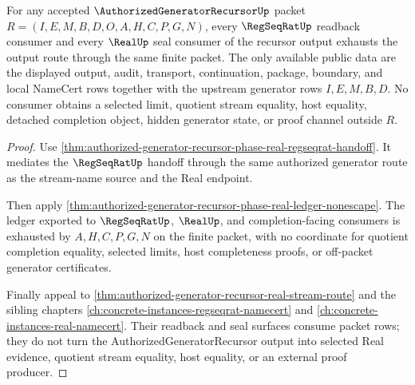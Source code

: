 \begin{theorem}
\label{thm:authorized-generator-recursor-regseqrat-real-seal-output-exhaustion}
For any accepted $\AuthorizedGeneratorRecursorUp$ packet $R=(I,E,M,B,D,O,A,H,C,P,G,N)$, every $\RegSeqRatUp$ readback consumer and every $\RealUp$ seal consumer of the recursor output exhausts the output route through the same finite packet. The only available public data are the displayed output, audit, transport, continuation, package, boundary, and local NameCert rows together with the upstream generator rows $I,E,M,B,D$. No consumer obtains a selected limit, quotient stream equality, host equality, detached completion object, hidden generator state, or proof channel outside $R$.
\end{theorem}
\begin{proof}
Use \autoref{thm:authorized-generator-recursor-phase-real-regseqrat-handoff}. It mediates the $\RegSeqRatUp$ handoff through the same authorized generator route as the stream-name source and the Real endpoint.

Then apply \autoref{thm:authorized-generator-recursor-phase-real-ledger-nonescape}. The ledger exported to $\RegSeqRatUp$, $\RealUp$, and completion-facing consumers is exhausted by $A,H,C,P,G,N$ on the finite packet, with no coordinate for quotient completion equality, selected limits, host completeness proofs, or off-packet generator certificates.

Finally appeal to \autoref{thm:authorized-generator-recursor-real-stream-route} and the sibling chapters \autoref{ch:concrete-instances-regseqrat-namecert} and \autoref{ch:concrete-instances-real-namecert}. Their readback and seal surfaces consume packet rows; they do not turn the AuthorizedGeneratorRecursor output into selected Real evidence, quotient stream equality, host equality, or an external proof producer.
\end{proof}

